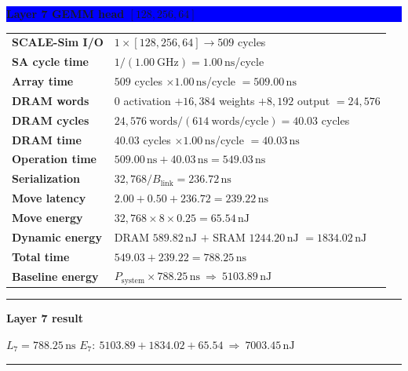 \documentclass[10pt]{article}
\newcommand{\ns}{\,\mathrm{ns}}
\newcommand{\nj}{\,\mathrm{nJ}}
\newenvironment{resultbox}[1]
  {\begin{center}\begin{minipage}{0.93\linewidth}\color{green}
   \hrule height 1pt\vspace{0.35em}\textbf{#1}\par\smallskip\color{black}}
  {\vspace{0.25em}\color{green}\hrule height 1pt\end{minipage}\end{center}}
\newcommand{\layerbar}[1]{\vspace{0.35em}\noindent
  \colorbox{blue}{\parbox{\dimexpr\linewidth-2\fboxsep\relax}{
  \color{white}\bfseries #1}}\par\vspace{0.2em}}
\begin{document}
\newpage
\layerbar{Layer 7 \quad GEMM head \quad $[128,256,64]$}
\begin{tabularx}{\linewidth}{@{}L Y@{}}
\textbf{SCALE-Sim I/O} & $1\times[128,256,64]\rightarrow509$ cycles \\
\textbf{SA cycle time} & $1/(1.00\ \mathrm{GHz})=1.00\ns$/cycle \\
\textbf{Array time} & $509$ cycles $\times1.00\ns$/cycle $=509.00\ns$ \\
\textbf{DRAM words} & $0$ activation $+16{,}384$ weights $+8{,}192$ output $=24{,}576$ \\
\textbf{DRAM cycles} & $24{,}576\ \mathrm{words}/(614\ \mathrm{words/cycle})=40.03$ cycles \\
\textbf{DRAM time} & $40.03$ cycles $\times1.00\ns$/cycle $=40.03\ns$ \\
\textbf{Operation time} & $509.00\ns+40.03\ns=549.03\ns$ \\
\textbf{Serialization} & $32{,}768/B_{\mathrm{link}}=236.72\ns$ \\
\textbf{Move latency} & $2.00+0.50+236.72=239.22\ns$ \\
\textbf{Move energy} & $32{,}768\times8\times0.25=65.54\nj$ \\
\textbf{Dynamic energy} & DRAM $589.82\nj$ $+$ SRAM $1244.20\nj$ $=1834.02\nj$ \\
\textbf{Total time} & $549.03+239.22=788.25\ns$ \\
\textbf{Baseline energy} & $P_{\mathrm{system}}\times788.25\ns\ \Longrightarrow\ 5103.89\nj$ \\
\bottomrule
\end{tabularx}
\begin{resultbox}{Layer 7 result}
$L_7=788.25\ns$ \hfill $E_7:\ 5103.89+1834.02+65.54\ \Longrightarrow\ 7003.45\nj$
\end{resultbox}
\end{document}
